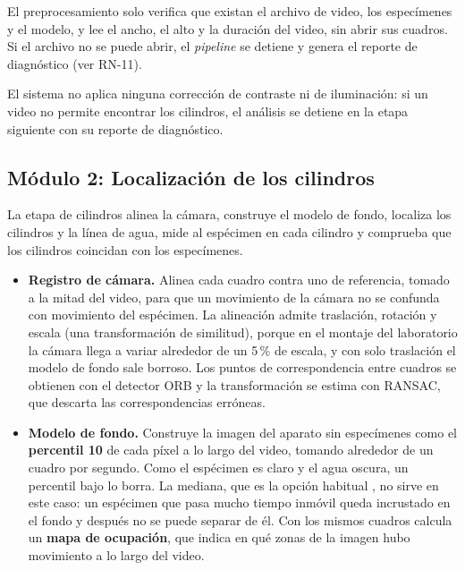 El preprocesamiento solo verifica que existan el archivo de video, los especímenes y el modelo, y lee el ancho, el alto y la duración del video, sin abrir sus cuadros. Si el archivo no se puede abrir, el \textit{pipeline} se detiene y genera el reporte de diagnóstico (ver RN-11).

El sistema no aplica ninguna corrección de contraste ni de iluminación: si un video
no permite encontrar los cilindros, el análisis se detiene en la etapa siguiente con
su reporte de diagnóstico.

\subsection{Módulo 2: Localización de los cilindros}

La etapa de cilindros alinea la cámara, construye el modelo de fondo, localiza los cilindros y la línea de agua, mide al espécimen en cada cilindro y comprueba que los cilindros coincidan con los especímenes.

\begin{itemize}
  \item \textbf{Registro de cámara.} Alinea cada cuadro contra uno de referencia,
        tomado a la mitad del video, para que un movimiento de la cámara no se
        confunda con movimiento del espécimen. La alineación admite traslación,
        rotación y escala (una transformación de similitud), porque en el montaje
        del laboratorio la cámara llega a variar alrededor de un 5\,\% de escala, y
        con solo traslación el modelo de fondo sale borroso. Los puntos de
        correspondencia entre cuadros se obtienen con el detector ORB y la
        transformación se estima con RANSAC, que descarta las correspondencias
        erróneas.

  \item \textbf{Modelo de fondo.} Construye la imagen del aparato sin especímenes
        como el \textbf{percentil 10} de cada píxel a lo largo del video, tomando
        alrededor de un cuadro por segundo. Como el espécimen es claro y el agua
        oscura, un percentil bajo lo borra. La mediana, que es la opción habitual
        \cite{piccardi2004}, no sirve en este caso: un espécimen que pasa mucho
        tiempo inmóvil queda incrustado en el fondo y después no se puede separar
        de él. Con los mismos cuadros calcula un \textbf{mapa de ocupación}, que
        indica en qué zonas de la imagen hubo movimiento a lo largo del video.
\end{itemize}

